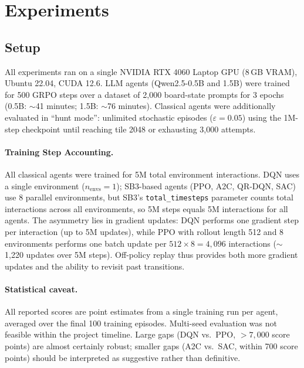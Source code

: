 \documentclass[letterpaper]{article}
\begin{document}
\section{Experiments}
\label{sec:experiments}

\subsection{Setup}

All experiments ran on a single NVIDIA RTX 4060 Laptop GPU (8\,GB VRAM), Ubuntu 22.04, CUDA 12.6. LLM agents (Qwen2.5-0.5B and 1.5B) were trained for 500 GRPO steps over a dataset of 2,000 board-state prompts for 3 epochs (0.5B: $\sim$41 minutes; 1.5B: $\sim$76 minutes). Classical agents were additionally evaluated in ``hunt mode'': unlimited stochastic episodes ($\varepsilon{=}0.05$) using the 1M-step checkpoint until reaching tile 2048 or exhausting 3,000 attempts.

\paragraph{Training Step Accounting.} All classical agents were trained for 5M total environment interactions. DQN uses a single environment ($n_{\text{envs}}{=}1$); SB3-based agents (PPO, A2C, QR-DQN, SAC) use 8 parallel environments, but SB3's \texttt{total\_timesteps} parameter counts total interactions across all environments, so 5M steps equals 5M interactions for all agents. The asymmetry lies in gradient updates: DQN performs one gradient step per interaction (up to 5M updates), while PPO with rollout length 512 and 8 environments performs one batch update per $512{\times}8{=}4{,}096$ interactions ($\sim$1,220 updates over 5M steps). Off-policy replay thus provides both more gradient updates and the ability to revisit past transitions.

\paragraph{Statistical caveat.} All reported scores are point estimates from a single training run per agent, averaged over the final 100 training episodes. Multi-seed evaluation was not feasible within the project timeline. Large gaps (DQN vs.\ PPO, $>7{,}000$ score points) are almost certainly robust; smaller gaps (A2C vs.\ SAC, within 700 score points) should be interpreted as suggestive rather than definitive.
\end{document}
